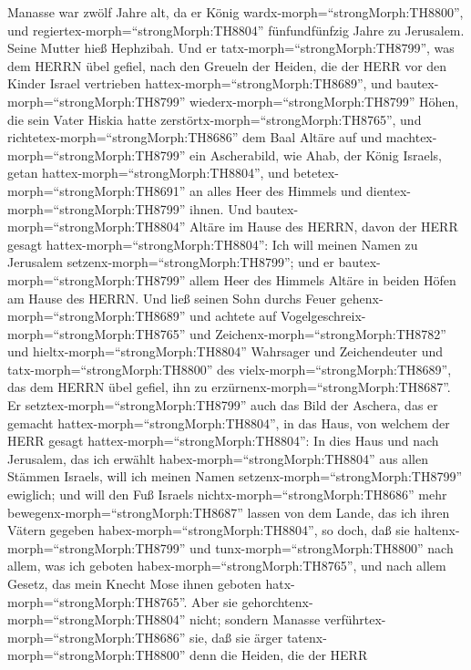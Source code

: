  Manasse war zwölf Jahre alt, da er König
wardx-morph=``strongMorph:TH8800'', und
regiertex-morph=``strongMorph:TH8804'' fünfundfünfzig Jahre zu
Jerusalem. Seine Mutter hieß Hephzibah.  Und er
tatx-morph=``strongMorph:TH8799'', was dem HERRN übel gefiel, nach den
Greueln der Heiden, die der HERR vor den Kinder Israel vertrieben
hattex-morph=``strongMorph:TH8689'',  und
bautex-morph=``strongMorph:TH8799'' wiederx-morph=``strongMorph:TH8799''
Höhen, die sein Vater Hiskia hatte
zerstörtx-morph=``strongMorph:TH8765'', und
richtetex-morph=``strongMorph:TH8686'' dem Baal Altäre auf und
machtex-morph=``strongMorph:TH8799'' ein Ascherabild, wie Ahab, der
König Israels, getan hattex-morph=``strongMorph:TH8804'', und
betetex-morph=``strongMorph:TH8691'' an alles Heer des Himmels und
dientex-morph=``strongMorph:TH8799'' ihnen.  Und
bautex-morph=``strongMorph:TH8804'' Altäre im Hause des HERRN, davon der
HERR gesagt hattex-morph=``strongMorph:TH8804'': Ich will meinen Namen
zu Jerusalem setzenx-morph=``strongMorph:TH8799'';  und er
bautex-morph=``strongMorph:TH8799'' allem Heer des Himmels Altäre in
beiden Höfen am Hause des HERRN.  Und ließ seinen Sohn
durchs Feuer gehenx-morph=``strongMorph:TH8689'' und achtete auf
Vogelgeschreix-morph=``strongMorph:TH8765'' und
Zeichenx-morph=``strongMorph:TH8782'' und
hieltx-morph=``strongMorph:TH8804'' Wahrsager und Zeichendeuter und
tatx-morph=``strongMorph:TH8800'' des
vielx-morph=``strongMorph:TH8689'', das dem HERRN übel gefiel, ihn zu
erzürnenx-morph=``strongMorph:TH8687''.  Er
setztex-morph=``strongMorph:TH8799'' auch das Bild der Aschera, das er
gemacht hattex-morph=``strongMorph:TH8804'', in das Haus, von welchem
der HERR gesagt hattex-morph=``strongMorph:TH8804'': In dies Haus und
nach Jerusalem, das ich erwählt habex-morph=``strongMorph:TH8804'' aus
allen Stämmen Israels, will ich meinen Namen
setzenx-morph=``strongMorph:TH8799'' ewiglich;  und will den
Fuß Israels nichtx-morph=``strongMorph:TH8686'' mehr
bewegenx-morph=``strongMorph:TH8687'' lassen von dem Lande, das ich
ihren Vätern gegeben habex-morph=``strongMorph:TH8804'', so doch, daß
sie haltenx-morph=``strongMorph:TH8799'' und
tunx-morph=``strongMorph:TH8800'' nach allem, was ich geboten
habex-morph=``strongMorph:TH8765'', und nach allem Gesetz, das mein
Knecht Mose ihnen geboten hatx-morph=``strongMorph:TH8765''.
 Aber sie gehorchtenx-morph=``strongMorph:TH8804'' nicht;
sondern Manasse verführtex-morph=``strongMorph:TH8686'' sie, daß sie
ärger tatenx-morph=``strongMorph:TH8800'' denn die Heiden, die der HERR
